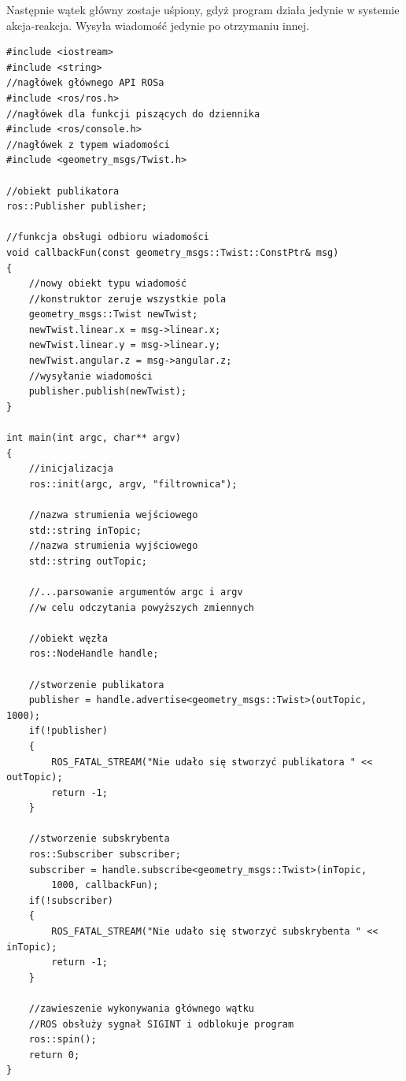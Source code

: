 			Następnie wątek główny zostaje uśpiony, gdyż program działa jedynie w systemie akcja-reakcja.
			Wysyła wiadomość jedynie po otrzymaniu innej.
			
			\begin{verbatim}
#include <iostream>
#include <string>
//nagłówek głównego API ROSa
#include <ros/ros.h>
//nagłówek dla funkcji piszących do dziennika
#include <ros/console.h>
//nagłówek z typem wiadomości
#include <geometry_msgs/Twist.h>
			
//obiekt publikatora
ros::Publisher publisher;
			
//funkcja obsługi odbioru wiadomości
void callbackFun(const geometry_msgs::Twist::ConstPtr& msg)
{
	//nowy obiekt typu wiadomość 
	//konstruktor zeruje wszystkie pola
	geometry_msgs::Twist newTwist;
	newTwist.linear.x = msg->linear.x;
	newTwist.linear.y = msg->linear.y;
	newTwist.angular.z = msg->angular.z;
	//wysyłanie wiadomości
	publisher.publish(newTwist);
}

int main(int argc, char** argv)
{
	//inicjalizacja
	ros::init(argc, argv, "filtrownica");

	//nazwa strumienia wejściowego
	std::string inTopic;
	//nazwa strumienia wyjściowego
	std::string outTopic;
	
	//...parsowanie argumentów argc i argv 
	//w celu odczytania powyższych zmiennych

	//obiekt węzła
	ros::NodeHandle handle;
	
	//stworzenie publikatora
	publisher = handle.advertise<geometry_msgs::Twist>(outTopic, 1000);
	if(!publisher)
	{
		ROS_FATAL_STREAM("Nie udało się stworzyć publikatora " << outTopic);
		return -1;
	}
	
	//stworzenie subskrybenta
	ros::Subscriber subscriber;
	subscriber = handle.subscribe<geometry_msgs::Twist>(inTopic, 
		1000, callbackFun);
	if(!subscriber)
	{
		ROS_FATAL_STREAM("Nie udało się stworzyć subskrybenta " << inTopic);
		return -1;
	}

	//zawieszenie wykonywania głównego wątku
	//ROS obsłuży sygnał SIGINT i odblokuje program
	ros::spin();
	return 0;
}
			\end{verbatim}
			

